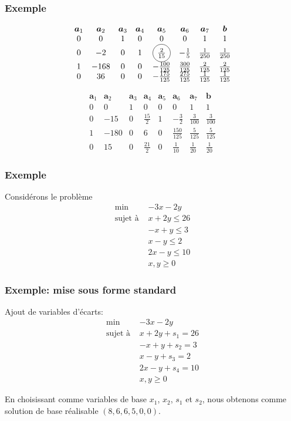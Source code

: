 \documentclass[usepdftitle=false]{beamer}
\newcommand*\circled[1]{\tikz[baseline=(char.base)]{
		\node[shape=circle,draw,inner sep=2pt] (char) {#1};}}
\def\ba{\boldsymbol{a}}
\def\bb{\boldsymbol{b}}
\begin{document}
\begin{frame}
\frametitle{Exemple}

\[
\begin{matrix}
\ba_1 & \ba_2 & \ba_3 & \ba_4 & \ba_5 &\ba_6 &\ba_7 & \bb \\
0 & 0 & 1 & 0 & 0 & 0 & 1 & 1 \\
0 & -2 & 0 & 1 & \circled{$\frac{2}{15}$} & -\frac{1}{5} & \frac{1}{250} & \frac{1}{250} \\
1 & -168 & 0 & 0 & -\frac{100}{125} & \frac{300}{125} & \frac{2}{125} & \frac{2}{125} \\
0 & 36 & 0 & 0 & -\frac{175}{125} & \frac{275}{125} & \frac{1}{125} & \frac{1}{125}
\end{matrix}
\]

\[
\begin{matrix}
\ba_1 & \ba_2 & \ba_3 & \ba_4 & \ba_5 &\ba_6 &\ba_7 & \bb \\
0 & 0 & 1 & 0 & 0 & 0 & 1 & 1 \\
0 & -15 & 0 & \frac{15}{2} & 1 & -\frac{3}{2} & \frac{3}{100} & \frac{3}{100} \\
1 & -180 & 0 & 6 & 0 & \frac{150}{125} & \frac{5}{125} & \frac{5}{125} \\
0 & 15 & 0 & \frac{21}{2} & 0 & \frac{1}{10} & \frac{1}{20} & \frac{1}{20}
\end{matrix}
\]

\end{frame}

\begin{frame}
\frametitle{Exemple}

Considérons le problème
\begin{align*}
\min\ & -3x -2y \\
\text{sujet à } & x + 2y \leq 26 \\
& -x + y \leq 3 \\
& x - y \leq 2 \\
& 2x - y \leq 10 \\
& x, y \geq 0
\end{align*}

\end{frame}

\begin{frame}
\frametitle{Exemple: mise sous forme standard}

Ajout de variables d'écarts:
\begin{align*}
\min\ & -3x -2y \\
\text{sujet à } & x + 2y + s_1 = 26 \\
& -x + y + s_2 = 3 \\
& x - y + s_3 = 2 \\
& 2x - y + s_4 = 10 \\
& x, y \geq 0
\end{align*}

En choisissant comme variables de base $x_1$, $x_2$, $s_1$ et $s_2$, nous obtenons comme solution de base réalisable $(8, 6, 6, 5, 0, 0)$.

\end{frame}
\end{document}
